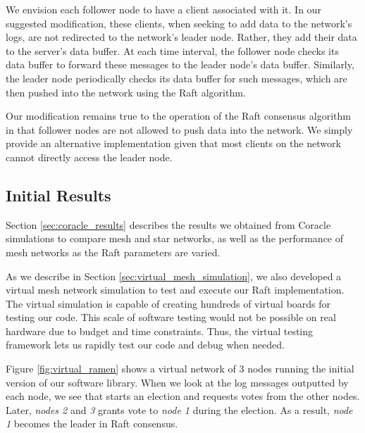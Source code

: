 We envision each follower node to have a client associated with it. In our suggested modification, these clients, when seeking to add data to the network's logs, are not redirected to the network's leader node. Rather, they add their data to the server's data buffer. At each time interval, the follower node checks its data buffer to forward these messages to the leader node's data buffer. Similarly, the leader node periodically checks its data buffer for such messages, which are then pushed into the network using the Raft algorithm. 

Our modification remains true to the operation of the Raft consensus algorithm in that follower nodes are not allowed to push data into the network. We simply provide an alternative implementation given that most clients on the network cannot directly access the leader node. 

\subsection{Initial Results}

Section \ref{sec:coracle_results} describes the results we obtained from Coracle simulations to compare mesh and star networks, as well as the performance of mesh networks as the Raft parameters are varied.

As we describe in Section \ref{sec:virtual_mesh_simulation}, we also developed a virtual mesh network simulation to test and execute our Raft implementation. The virtual simulation is capable of creating hundreds of virtual boards for testing our code. This scale of software testing would not be possible on real hardware due to budget and time constraints. Thus, the virtual testing framework lets us rapidly test our code and debug when needed.

Figure \ref{fig:virtual_ramen} shows a virtual network of 3 nodes running the initial version of our software library. When we look at the log messages outputted by each node, we see that  starts an election and requests votes from the other nodes. Later, \emph{nodes 2} and \emph{3} grants vote to \emph{node 1} during the election. As a result, \emph{node 1} becomes the leader in Raft consensus.

\vspace{-15pt}

